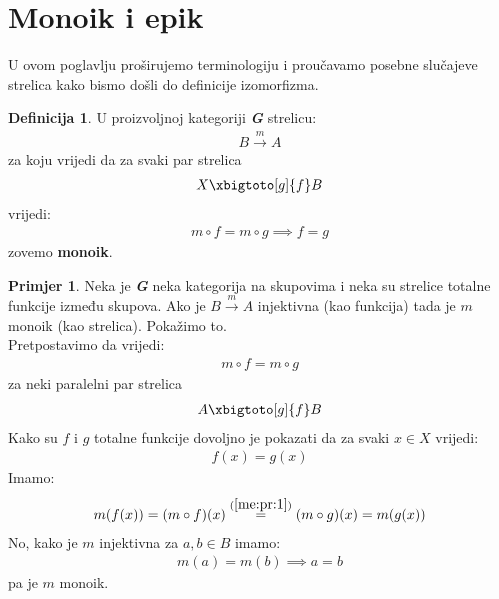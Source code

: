 \documentclass[11pt]{article}
\newcommand{\category}[1]{\textbf{\emph{#1}}}
\theoremstyle{definition}
\newtheorem{definition}{Definicija}
\newtheorem{primjer}{Primjer}
\begin{document}
  \section{Monoik i epik}
  U ovom poglavlju proširujemo terminologiju i proučavamo posebne slučajeve
  strelica kako bismo došli do definicije izomorfizma.
  \begin{definition}
    U proizvoljnoj kategoriji \category{G} strelicu:
    \begin{align*}
      B \xrightarrow{m} A
    \end{align*}
    za koju vrijedi da za svaki par strelica
    \begin{align*}
      X \xbigtoto[g]{f} B
    \end{align*}
    vrijedi:
    \begin{align}
      m \circ f = m \circ g \implies f = g
    \end{align}
    zovemo \textbf{monoik}.
  \end{definition}
  \begin{primjer}
    Neka je \category{G} neka kategorija na skupovima i neka su strelice
    totalne funkcije između skupova.
    Ako je $B \xrightarrow{m} A$ injektivna (kao funkcija) tada je $m$ monoik (kao
    strelica). Pokažimo to.\\
    Pretpostavimo da vrijedi:
    \begin{align} \label{me:pr:1}
      m \circ f = m \circ g
    \end{align}
    za neki paralelni par strelica
    \begin{align*}
      A \xbigtoto[g]{f} B
    \end{align*}
    Kako su $f$ i $g$ totalne funkcije dovoljno je pokazati da za svaki $x \in X$
    vrijedi:
    \begin{align*}
      f(x) = g(x)
    \end{align*}
    Imamo:
    \begin{align*}
      m(f(x)) = (m \circ f)(x) \overset{(\ref{me:pr:1})}{=} (m \circ g)(x) = m(g(x))
    \end{align*}
    No, kako je $m$ injektivna za $a, b \in B$ imamo:
    \begin{align*}
      m(a) = m(b) \implies a = b
    \end{align*}
    pa je $m$ monoik.
    \end{primjer}
\end{document}
